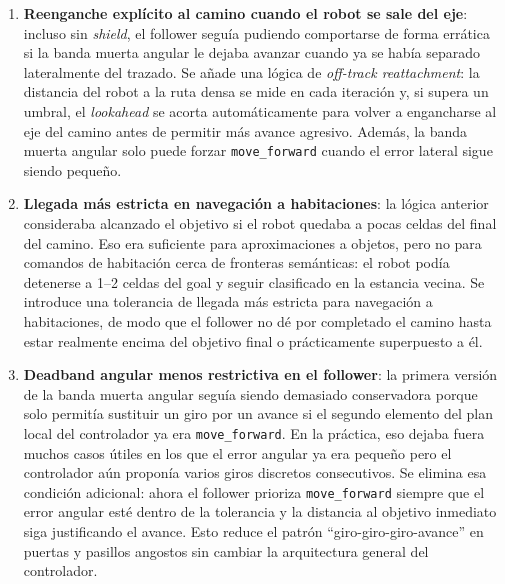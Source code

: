 \documentclass[11pt,a4paper]{article}
\begin{document}
\begin{enumerate}
  \item \textbf{Reenganche explícito al camino cuando el robot se sale del
        eje}: incluso sin \textit{shield}, el follower seguía pudiendo
        comportarse de forma errática si la banda muerta angular le dejaba
        avanzar cuando ya se había separado lateralmente del trazado. Se añade
        una lógica de \textit{off-track reattachment}: la distancia del robot a
        la ruta densa se mide en cada iteración y, si supera un umbral, el
        \textit{lookahead} se acorta automáticamente para volver a engancharse
        al eje del camino antes de permitir más avance agresivo. Además, la
        banda muerta angular solo puede forzar \texttt{move\_forward} cuando el
        error lateral sigue siendo pequeño.

  \item \textbf{Llegada más estricta en navegación a habitaciones}: la lógica
        anterior consideraba alcanzado el objetivo si el robot quedaba a pocas
        celdas del final del camino. Eso era suficiente para aproximaciones a
        objetos, pero no para comandos de habitación cerca de fronteras
        semánticas: el robot podía detenerse a 1--2 celdas del goal y seguir
        clasificado en la estancia vecina. Se introduce una tolerancia de
        llegada más estricta para navegación a habitaciones, de modo que el
        follower no dé por completado el camino hasta estar realmente encima
        del objetivo final o prácticamente superpuesto a él.

  \item \textbf{Deadband angular menos restrictiva en el follower}: la primera
        versión de la banda muerta angular seguía siendo demasiado conservadora
        porque solo permitía sustituir un giro por un avance si el segundo
        elemento del plan local del controlador ya era \texttt{move\_forward}.
        En la práctica, eso dejaba fuera muchos casos útiles en los que el
        error angular ya era pequeño pero el controlador aún proponía varios
        giros discretos consecutivos. Se elimina esa condición adicional: ahora
        el follower prioriza \texttt{move\_forward} siempre que el error angular
        esté dentro de la tolerancia y la distancia al objetivo inmediato siga
        justificando el avance. Esto reduce el patrón
        ``giro-giro-giro-avance'' en puertas y pasillos angostos sin cambiar la
        arquitectura general del controlador.

\end{enumerate}
\end{document}
